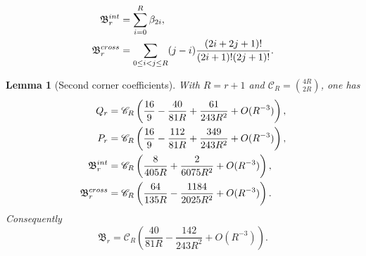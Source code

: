 \documentclass[10pt,a4paper]{amsart}
\newtheorem{lemma}{Lemma}
\begin{document}
\begin{align}
 \mathfrak B_r^{\rm int}
 &=\sum_{i=0}^{R}\beta_{2i},
 \label{eq:B-int-exact}\\
 \mathfrak B_r^{\rm cross}
 &=\sum_{0\le i<j\le R}(j-i)
 \frac{(2i+2j+1)!}{(2i+1)!(2j+1)!}.
 \label{eq:B-cross-exact}
\end{align}

\begin{lemma}[Second corner coefficients]
\label{lem:second-corner-coefficients}
With $R=r+1$ and $\mathscr C_R=\binom{4R}{2R}$, one has
\begin{align}
 Q_r
 &=\mathscr C_R\left(
 \frac{16}{9}-\frac{40}{81R}+\frac{61}{243R^2}
 +O(R^{-3})\right),
 \label{eq:Q-second-corner}\\
 P_r
 &=\mathscr C_R\left(
 \frac{16}{9}-\frac{112}{81R}+\frac{349}{243R^2}
 +O(R^{-3})\right),
 \label{eq:P-second-corner}\\
 \mathfrak B_r^{\rm int}
 &=\mathscr C_R\left(
 \frac{8}{405R}+\frac{2}{6075R^2}+O(R^{-3})\right),
 \label{eq:Bint-second-corner}\\
 \mathfrak B_r^{\rm cross}
 &=\mathscr C_R\left(
 \frac{64}{135R}-\frac{1184}{2025R^2}+O(R^{-3})\right).
 \label{eq:Bcross-second-corner}
\end{align}
Consequently
\begin{equation}
 {
 \mathfrak B_r
 =\mathscr C_R\left(
 \frac{40}{81R}-\frac{142}{243R^2}+O(R^{-3})\right).}
 \label{eq:B-second-corner}
\end{equation}
\end{lemma}
\end{document}
